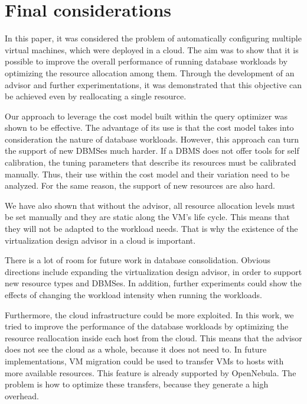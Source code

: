 \chapter{\textbf{Final considerations}}

In this paper, it was considered the problem of automatically configuring multiple virtual machines, which were deployed in a cloud. The aim was to show that it is possible to improve the overall performance of running database workloads by optimizing the resource allocation among them. Through the development of an advisor and further experimentations, it was demonstrated that this objective can be achieved even by reallocating a single resource.

Our approach to leverage the cost model built within the query optimizer was shown to be effective. The advantage of its use is that the cost model takes into consideration the nature of database workloads. However, this approach can turn the support of new DBMSes much harder. If a DBMS does not offer tools for self calibration, the tuning parameters that describe its resources must be calibrated manually. Thus, their use within the cost model and their variation need to be analyzed. For the same reason, the support of new resources are also hard.

We have also shown that without the advisor, all resource allocation levels must be set manually and they are static along the VM's life cycle. This means that they will not be adapted to the workload needs. That is why the existence of the virtualization design advisor in a cloud is important.

There is a lot of room for future work in database consolidation. Obvious directions include expanding the virtualization design advisor, in order to support new resource types and DBMSes. In addition, further experiments could show the effects of changing the workload intensity when running the workloads.

Furthermore, the cloud infrastructure could be more exploited. In this work, we tried to improve the performance of the database workloads by optimizing the resource reallocation inside each host from the cloud. This means that the advisor does not see the cloud as a whole, because it does not need to. In future implementations, VM migration could be used to transfer VMs to hosts with more available resources.  This feature is already supported by OpenNebula. The problem is how to optimize these transfers, because they generate a high overhead. 

